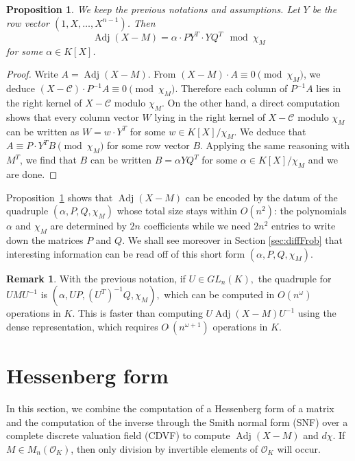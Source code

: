 \documentclass[sigconf]{acmart}
\DeclareMathOperator{\adj}{Adj}
\newcommand{\OK}{\mathcal{O}_K}
\newcommand{\softO}{O\tilde{~}}
\newtheorem{prop}[theo]{Proposition}
\theoremstyle{definition}
\newtheorem{rem}[theo]{Remark}
\begin{document}
\begin{prop}
\label{prop:shortcom}
We keep the previous notations and assumptions.
Let $Y$ be the row vector $(1, X, \ldots, X^{n-1})$. Then
\begin{equation}
\label{eq:shortcom}
\adj(X{-}M) = \alpha \cdot P Y^T \cdot Y Q^T
\mod \chi_M
\end{equation}
for some $\alpha \in K[X]$.
\end{prop}

\begin{proof}
Write $A = \adj(X{-}M)$. From $(X{-}M) \cdot A \equiv 0 
\pmod{\chi_M}$, we deduce $(X{-}\mathscr{C}) \cdot P^{-1} A \equiv 0 \pmod{\chi_M}$. 
Therefore each column of $P^{-1} A$ lies in the right kernel of $X{-}\mathscr{C}$
modulo $\chi_M$. On the other hand, a direct computation shows that
every column vector $W$ lying in the right kernel of $X{-}\mathscr{C}$ modulo 
$\chi_M$ can be written as $W = w \cdot Y^T$ for some $w \in 
K[X]/\chi_M$. We deduce that $A \equiv P \cdot Y^T B \pmod{\chi_M}$
for some row vector $B$.
Applying the same reasoning with $M^T$, we find that $B$ can be
written $B = \alpha Y Q^T$ for some $\alpha \in K[X]/\chi_M$ and
we are done.
\end{proof}

Proposition~\ref{prop:shortcom} shows that $\adj(X{-}M)$ can be encoded 
by the datum of the quadruple $(\alpha, P, Q, \chi_M)$ whose total size 
stays within $O(n^2)$: the polynomials $\alpha$ and $\chi_M$ are 
determined by $2n$ coefficients while we need $2n^2$ entries to 
write down the matrices $P$ and $Q$. 
We shall see moreover in Section \ref{sec:diffFrob} that interesting
information can be read off of this short form $(\alpha, P, Q, 
\chi_M)$.

\begin{rem}
With the previous notation, if $U \in GL_n(K),$
the quadruple for 
$UMU^{-1}$ is
$(\alpha, UP, (U^T)^{-1}Q, \chi_M),$
which can be computed in $O(n^\omega)$ operations in $K.$
This is faster than computing $U \adj(X-M) U^{-1}$ using the dense
representation, which requires $\softO(n^{\omega+1})$ operations in $K.$
\end{rem}

\section{Hessenberg form}
\label{sec:diffHess}

In this section, we combine the computation of a Hessenberg form of a 
matrix and the computation of the inverse through the Smith normal form 
(SNF) over a complete discrete valuation field (CDVF) to compute 
$\adj(X{-}M)$ and $d \chi$. If $M \in M_n(\OK)$, then only division 
by invertible elements of $\OK$ will occur.
\end{document}
